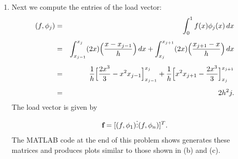 {\begin{solution}
\begin{enumerate}
\[\begin{bmatrix}
                           \vdots & \ddots & \vdots \\
                          a(\phi_n,\phi_1) & \cdots & a(\phi_n, \phi_n)\end{bmatrix}.\]
\item Next we compute the entries of the load vector:
\begin{eqnarray*}
(f,\phi_j) &=& \int_0^1 f(x) \phi_j(x)\,dx \\[0.5em]
           &=& \int_{x_{j-1}}^{x_{j}} (2x)\Big( {x-x_{j-1} \over h}\Big)\, dx 
              +\int_{x_{j}}^{x_{j+1}}  (2x)\Big( {x_{j+1}-x \over h}\Big)\, dx  \\[0.5em]
           &=& {1\over h}\Big[ {2x^3\over 3}  - x^2 x_{j-1}\Big]_{x_{j-1}}^{x_j}
              +{1\over h}\Big[ x^2 x_{j+1} - {2x^3 \over 3} \Big]_{x_{j}}^{x_{j+1}} \\[0.5em]
           &=&  2h^2 j.
\end{eqnarray*} 
The load vector is given by
\[ \textbf{f} = [ (f,\phi_1) \\ \vdots \\ (f,\phi_n)]^T.\] 
The MATLAB code at the end of this problem shows generates these matrices
and produces plots similar to those shown in (b) and (c).


\end{enumerate}
\end{solution}}
